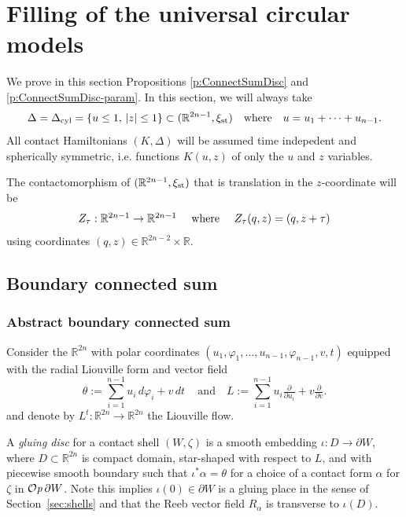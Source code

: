 \documentclass[12pt]{paper}
\theoremstyle{plain}
\theoremstyle{definition}
\newcommand{\p}{\partial}
\newcommand{\abs}[1]{\left| #1 \right|}
\newcommand{\R}{{\mathbb{R}}}
\newcommand{\st}{{\rm st}}
\newcommand{\cyl}{{\rm cyl}}
\def\Op{{\mathcal O}{\it p}\,}
\numberwithin{figure}{section}
\begin{document}
 

 

\section{Filling of the universal circular models}\label{sec:tripling}
We prove in this section Propositions \ref{p:ConnectSumDisc} and \ref{p:ConnectSumDisc-param}.
In this section, we will always take 
$$
	\Delta =\Delta_\cyl= \{ u \leq 1,\, \abs{z} \leq 1\} \subset (\R^{2n-1}, \xi_{\st})
	\quad\mbox{where}\quad u = u_1 + \dots + u_{n-1}.
$$ 
  All contact Hamiltonians $(K, \Delta)$ will be assumed time indepedent and spherically symmetric, i.e.
  functions $K(u,z)$ of only the $u$ and $z$ variables.

The contactomorphism of $(\R^{2n-1}, \xi_{\st})$ that is translation in the $z$-coordinate will be
$$
\mbox{$Z_\tau : \R^{2n-1} \to \R^{2n-1}$ \quad where \quad $Z_\tau(q,z) = (q, z +\tau)$}
$$
using coordinates $(q, z) \in \R^{2n-2} \times \R$.

\subsection{Boundary connected sum}\label{sec:BCS}

\subsubsection{Abstract boundary connected sum}\label{s:AbstractBCS}
	Consider the $\R^{2n}$ with polar coordinates 
	$(u_1, \varphi_1, \dots, u_{n-1}, \varphi_{n-1}, v, t)$ equipped with the radial
	Liouville form and vector field
	$$
		\theta := \sum_{i=1}^{n-1} u_i\, d\varphi_i + v\, dt\,\quad\mbox{and}\quad L := \sum_{i=1}^{n-1} u_i \tfrac{\p}{\p u_i}
		+ v \tfrac{\p}{\p v}.
	$$
	and denote by $L^t:\R^{2n}\to\R^{2n}$ the Liouville flow.
	
	 A \emph{gluing disc} for 
	a contact shell $(W, \zeta)$ is a smooth embedding $\iota: D \to \p W$, where $D \subset \R^{2n}$ is 
	compact domain, star-shaped with respect to $L$, and with piecewise smooth boundary %
	such that  $\iota^* \alpha = \theta$  for a choice of  a contact form 
	$\alpha$ for $\zeta$ in $\Op \p W$.  Note this implies $\iota(0) \in \p W$ is a gluing place in the sense of 
	Section~\ref{sec:shells} and that the Reeb vector field $R_{\alpha}$ is transverse to $\iota(D)$.
	
\end{document}
